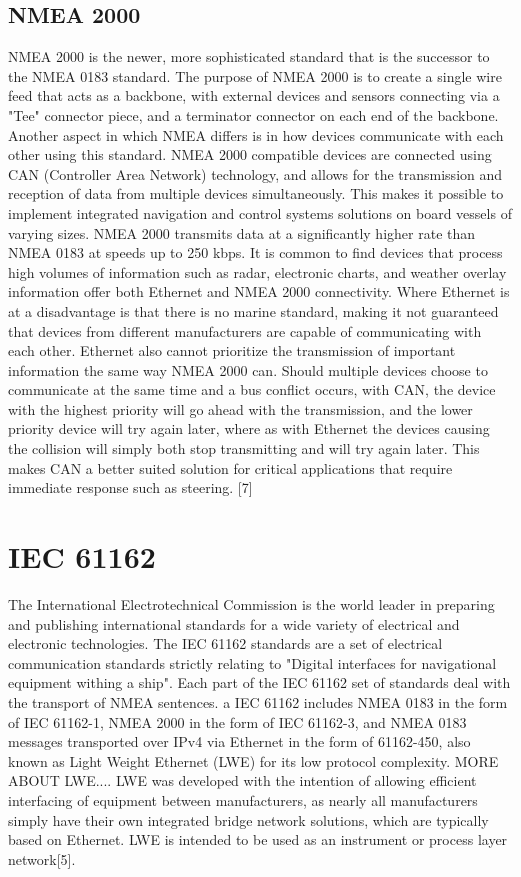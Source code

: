 \documentclass{report}
\begin{document}
\subsection{NMEA 2000}
NMEA 2000 is the newer, more sophisticated standard that is the successor to the NMEA 0183 standard. The purpose of NMEA 2000 is to create a single wire feed that acts as a backbone, with external devices and sensors connecting via a "Tee" connector piece, and a terminator connector on each end of the backbone. Another aspect in which NMEA differs is in how devices communicate with each other using this standard. NMEA 2000 compatible devices are connected using CAN (Controller Area Network) technology, and allows for the transmission and reception of data from multiple devices simultaneously. This makes it possible to implement integrated navigation and control systems solutions on board vessels of varying sizes. NMEA 2000 transmits data at a significantly higher rate than NMEA 0183 at speeds up to 250 kbps. It is common to find devices that process high volumes of information such as radar, electronic charts, and weather overlay information offer both Ethernet and NMEA 2000 connectivity. Where Ethernet is at a disadvantage is that there is no marine standard, making it not guaranteed that devices from different manufacturers are capable of communicating with each other. Ethernet also cannot prioritize the transmission of important information the same way NMEA 2000 can. Should multiple devices choose to communicate at the same time and a bus conflict occurs, with CAN, the device with the highest priority will go ahead with the transmission, and the lower priority device will try again later, where as with Ethernet the devices causing the collision will simply both stop transmitting and will try again later. This makes CAN a better suited solution for critical applications that require immediate response such as steering.
[7]   

\section{IEC 61162}
The International Electrotechnical Commission is the world leader in preparing and publishing international standards for a wide variety of electrical and electronic technologies. The IEC 61162 standards are a set of electrical communication standards strictly relating to "Digital interfaces for navigational equipment withing a ship". Each part of the IEC 61162 set of standards deal with the transport of NMEA sentences. a IEC 61162 includes NMEA 0183 in the form of IEC 61162-1, NMEA 2000 in the form of IEC 61162-3, and NMEA 0183 messages transported over IPv4 via Ethernet in the form of 61162-450, also known as Light Weight Ethernet (LWE) for its low protocol complexity. MORE ABOUT LWE.... LWE was developed with the intention of allowing efficient interfacing of equipment between manufacturers, as nearly all manufacturers simply have their own integrated bridge network solutions, which are typically based on Ethernet. LWE is intended to be used as an instrument or process layer network[5].
\end{document}
